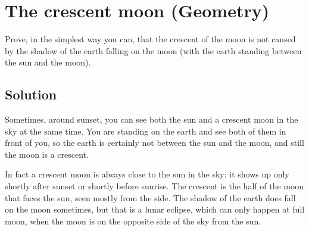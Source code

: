 \section {The crescent moon (Geometry)}

Prove, in the simplest way you can, that the crescent of the moon is not caused by the shadow of the earth falling on the moon
(with the earth standing between the sun and the moon).

\subsection{Solution}

Sometimes, around sunset, you can see both the sun and a crescent moon in the sky at the same time.
You are standing on the earth and see both of them in front of you, so the earth is certainly not between the sun and the moon,
and still the moon is a crescent.

In fact a crescent moon is always close to the sun in the sky: it shows up only shortly after sunset or shortly before sunrise.
The crescent is the half of the moon that faces the sun, seen mostly from the side.
The shadow of the earth does fall on the moon sometimes, but that is a lunar eclipse, which can only happen at full moon,
when the moon is on the opposite side of the sky from the sun.
